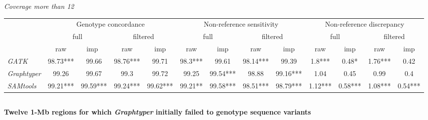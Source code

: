 \documentclass[../main.tex]{subfiles}
\begin{document}
\begin{flushleft}
\begin{landscape}
    \centering
    \emph{Coverage more than 12}
    \begin{footnotesize}
    \begin{tabular}{|l|c|c|c|c|c|c|c|c|c|c|c|c|} 
    \cline{2-13}
    \multicolumn{1}{c|}{\multirow{3}{*}{}} & \multicolumn{4}{c|}{Genotype concordance}                 & \multicolumn{4}{c|}{Non-reference sensitivity}            & \multicolumn{4}{c|}{Non-reference discrepancy}             \\ 
    \cline{2-13}
    \multicolumn{1}{c|}{}                  & \multicolumn{2}{c|}{full} & \multicolumn{2}{c|}{filtered} & \multicolumn{2}{c|}{full} & \multicolumn{2}{c|}{filtered} & \multicolumn{2}{c|}{full} & \multicolumn{2}{c|}{filtered}  \\ 
    \cline{2-13}
    \multicolumn{1}{c|}{}                  & raw      & imp~           & raw      & imp                & raw     & imp             & raw      & imp                & raw     & imp             & raw     & imp                  \\ 
    \arrayrulecolor{black}\cline{1-1}\arrayrulecolor{black}\cline{2-13}
    \emph{GATK}                                   & 98.73*** & 99.66          & 98.76*** & 99.71              & 98.3*** & 99.61           & 98.14*** & 99.39              & 1.8***  & 0.48*           & 1.76*** & 0.42                 \\ 
    \hline
    \emph{Graphtyper}                             & 99.26    & 99.67          & 99.3     & 99.72              & 99.25   & 99.54***        & 98.88    & 99.16***           & 1.04    & 0.45            & 0.99    & 0.4                  \\ 
    \hline
    \emph{SAMtools}                               & 99.21*** & 99.59***       & 99.24*** & 99.62***           & 99.21** & 99.58***        & 98.51*** & 98.79***           & 1.12*** & 0.58***         & 1.08*** & 0.54***              \\
    \hline
    \end{tabular}
    \end{footnotesize}


\end{landscape}

\newpage

\subsection{}
\label{supp_mat:25}
\textbf{\large{Twelve 1-Mb regions for which \emph{Graphtyper} initially failed to genotype sequence variants}}


\end{flushleft}
\end{document}
